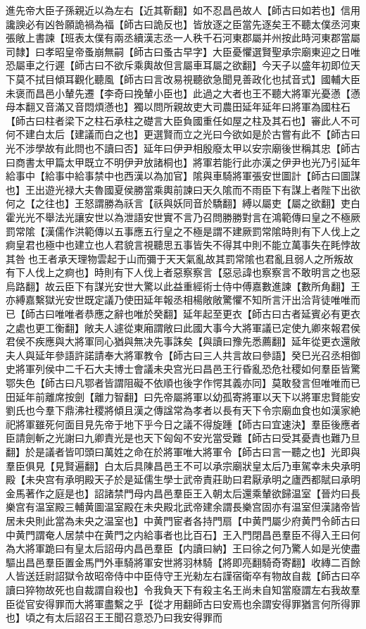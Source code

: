 進先帝大臣子孫親近以為左右【近其靳翻】如不忍昌邑故人【師古曰如若也】信用讒諛必有凶咎願詭禍為福【師古曰詭反也】皆放逐之臣當先逐矣王不聽太僕丞河東張敞上書諫【班表太僕有兩丞續漢志丞一人秩千石河東郡屬并州按此時河東郡當屬司隸】曰孝昭皇帝蚤崩無嗣【師古曰蚤古早字】大臣憂懼選賢聖承宗廟東迎之日唯恐屬車之行遲【師古曰不欲斥乘輿故但言屬車耳屬之欲翻】今天子以盛年初即位天下莫不拭目傾耳觀化聽風【師古曰言改易視聽欲急聞見善政化也拭音式】國輔大臣未褒而昌邑小輦先遷【李奇曰挽輦小臣也】此過之大者也王不聽大將軍光憂懣【懣母本翻又音滿又音悶煩懣也】獨以問所親故吏大司農田延年延年曰將軍為國柱石【師古曰柱者梁下之柱石承柱之礎言大臣負國重任如屋之柱及其石也】審此人不可何不建白太后【建議而白之也】更選賢而立之光曰今欲如是於古嘗有此不【師古曰光不涉學故有此問也不讀曰否】延年曰伊尹相殷廢太甲以安宗廟後世稱其忠【師古曰商書太甲篇太甲既立不明伊尹放諸桐也】將軍若能行此亦漢之伊尹也光乃引延年給事中【給事中給事禁中也西漢以為加官】隂與車騎將軍張安世圖計【師古曰圖謀也】王出遊光禄大夫魯國夏侯勝當乘輿前諫曰天久隂而不雨臣下有謀上者陛下出欲何之【之往也】王怒謂勝為祅言【祅與妖同音於驕翻】縛以屬吏【屬之欲翻】吏白霍光光不舉法光讓安世以為泄語安世實不言乃召問勝勝對言在鴻範傳曰皇之不極厥罰常隂【漢儒作洪範傳以五事應五行皇之不極是謂不建厥罰常隂時則有下人伐上之痾皇君也極中也建立也人君貌言視聽思五事皆失不得其中則不能立萬事失在眊悖故其咎也王者承天理物雲起于山而彌于天天氣亂故其罰常隂也君亂且弱人之所叛故有下人伐上之痾也】時則有下人伐上者惡察察言【惡忌諱也察察言不敢明言之也惡烏路翻】故云臣下有謀光安世大驚以此益重經術士侍中傅嘉數進諫【數所角翻】王亦縛嘉繫獄光安世既定議乃使田延年報丞相楊敞敞驚懼不知所言汗出洽背徒唯唯而已【師古曰唯唯者恭應之辭也唯於癸翻】延年起至更衣【師古曰古者延賓必有更衣之處也更工衡翻】敞夫人遽從東廂謂敞曰此國大事今大將軍議已定使九卿來報君侯君侯不疾應與大將軍同心猶與無决先事誅矣【與讀曰豫先悉薦翻】延年從更衣還敞夫人與延年參語許諾請奉大將軍教令【師古曰三人共言故曰參語】癸巳光召丞相御史將軍列侯中二千石大夫博士會議未央宫光曰昌邑王行昏亂恐危社稷如何羣臣皆驚鄂失色【師古曰凡鄂者皆謂阻礙不依順也後字作愕其義亦同】莫敢發言但唯唯而已田延年前離席按劍【離力智翻】曰先帝屬將軍以幼孤寄將軍以天下以將軍忠賢能安劉氏也今羣下鼎沸社稷將傾且漢之傳諡常為孝者以長有天下令宗廟血食也如漢家絶祀將軍雖死何面目見先帝于地下乎今日之議不得旋踵【師古曰宜速決】羣臣後應者臣請劍斬之光謝曰九卿責光是也天下匈匈不安光當受難【師古曰受其憂責也難乃旦翻】於是議者皆叩頭曰萬姓之命在於將軍唯大將軍令【師古曰言一聽之也】光即與羣臣俱見【見賢遍翻】白太后具陳昌邑王不可以承宗廟狀皇太后乃車駕幸未央承明殿【未央宫有承明殿天子於是延儒生學士武帝責莊助曰君厭承明之廬西都賦曰承明金馬著作之庭是也】詔諸禁門母内昌邑羣臣王入朝太后還乘輦欲歸温室【晉灼曰長樂宫有温室殿三輔黄圖温室殿在未央殿北武帝建余謂長樂宫固亦有温室但漢諸帝皆居未央則此當為未央之温室也】中黄門宦者各持門扇【中黄門屬少府黄門令師古曰中黄門謂奄人居禁中在黄門之内給事者也比百石】王入門閉昌邑羣臣不得入王曰何為大將軍跪曰有皇太后詔毋内昌邑羣臣【内讀曰納】王曰徐之何乃驚人如是光使盡驅出昌邑羣臣置金馬門外車騎將軍安世將羽林騎【將即亮翻騎奇寄翻】收縳二百餘人皆送廷尉詔獄令故昭帝侍中中臣侍守王光勑左右謹宿衛卒有物故自裁【師古曰卒讀曰猝物故死也自裁謂自殺也】令我負天下有殺主名王尚未自知當廢謂左右我故羣臣從官安得罪而大將軍盡繫之乎【從才用翻師古曰安焉也余謂安得罪猶言何所得罪也】頃之有太后詔召王王聞召意恐乃曰我安得罪而